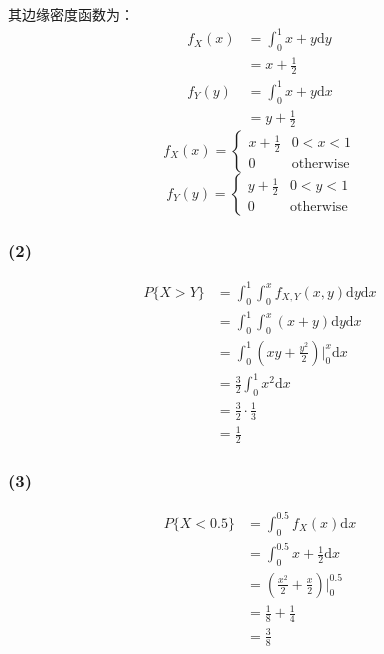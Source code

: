 \documentclass[a4paper,12pt]{ctexart}
\begin{document}
其边缘密度函数为：
\begin{align*}
	f_X(x) &= \int_0^1 x + y \mathrm{d}y \\
	&= x + \frac{1}{2} \\
	f_Y(y) &= \int_0^1 x + y \mathrm{d}x \\
	&= y + \frac{1}{2}
\end{align*}
\begin{equation*}
	f_X(x) = 
	\begin{cases}
		x + \frac{1}{2} & 0 < x < 1 \\
		0 & \text{otherwise}
	\end{cases}
\end{equation*}
\begin{equation*}
	f_Y(y) = 
	\begin{cases}
		y + \frac{1}{2} & 0 < y < 1 \\
		0 & \text{otherwise}
	\end{cases}
\end{equation*}

\subsubsection*{(2)}

\begin{align*}
	P\{X > Y\} &= \int_0^1 \int_0^x f_{X,Y}(x,y) \mathrm{d}y \mathrm{d}x \\
	&= \int_0^1 \int_0^x (x + y) \mathrm{d}y \mathrm{d}x \\
	&= \int_0^1 \left( xy + \frac{y^2}{2} \right) \Big|_0^x \mathrm{d}x \\
	&= \frac{3}{2} \int_0^1 x^2 \mathrm{d}x \\
	&= \frac{3}{2} \cdot \frac{1}{3} \\
	&= \frac{1}{2}
\end{align*}

\subsubsection*{(3)}

\begin{align*}
	P\{X < 0.5\} &= \int_0^{0.5} f_X(x) \mathrm{d}x \\
	&= \int_0^{0.5} x + \frac{1}{2} \mathrm{d}x \\
	&= \left( \frac{x^2}{2} + \frac{x}{2} \right) \Big|_0^{0.5} \\
	&= \frac{1}{8} + \frac{1}{4} \\
	&= \frac{3}{8}
\end{align*}
\end{document}
